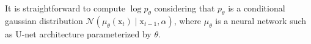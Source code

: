 \noindent It is straightforward to compute $\log p_{\theta}$ considering that
$p_{\theta}$ is a conditional gaussian distribution 
$\mathcal{N}(\mu_{\theta}(\mathrm{x}_{t})\mid\mathrm{x}_{t-1}, \alpha)$, where
$\mu_{\theta}$ is a neural network such as U-net architecture parameterized by $\theta$. %






